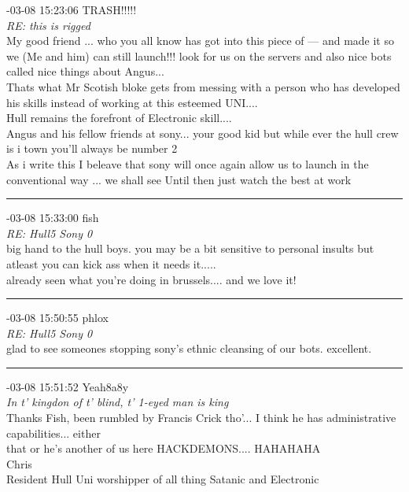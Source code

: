 \begin{mail}
{-03-08 15:23:06 TRASH!!!!!}\\
{\itshape RE: this is rigged}\\
My good friend ... who you all know has got into this piece of --- and made it so we (Me and him) can still launch!!! look for us on the servers and also nice bots called nice things about Angus...\\
Thats what Mr Scotish bloke gets from messing with a person who has developed his skills instead of working at this esteemed UNI....\\
Hull remains the forefront of Electronic skill....\\
Angus and his fellow friends at sony... your good kid but while ever the hull crew is i  town you'll always be number 2\\
As i write this I beleave that sony will once again allow us to launch in the conventional way ... we shall see 
Until then just watch the best at work\\

\rule{0.8\textwidth}{.4pt}

{-03-08 15:33:00 fish}\\
{\itshape RE: Hull5 Sony 0}\\
big hand to the hull boys.
you may be a bit sensitive to personal insults but atleast you can kick ass when it needs it.....\\ \enlargethispage{1\baselineskip}
already seen what you're doing in brussels.... and we love it!\\

\rule{0.8\textwidth}{.4pt}

{-03-08 15:50:55 phlox}\\
{\itshape RE: Hull5 Sony 0}\\
glad to see someones stopping sony's ethnic cleansing of our bots. excellent.\\

\rule{0.8\textwidth}{.4pt}

{-03-08 15:51:52 Yeah8a8y}\\
{\itshape In t' kingdon of t' blind, t' 1-eyed man is king}\\
Thanks Fish, been rumbled by Francis Crick tho'... I think he has administrative capabilities... either \\
that or he's another of us here HACKDEMONS.... HAHAHAHA\\
Chris\\
Resident Hull Uni worshipper of all thing Satanic and Electronic\\


\end{mail}
